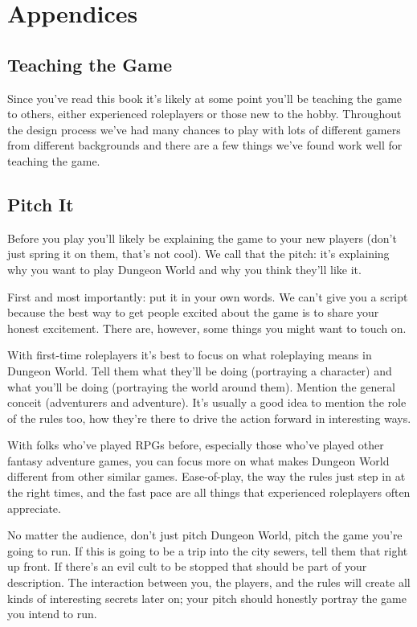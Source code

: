 \chapter{Appendices}
\section{Teaching the Game}


Since you've read this book it's likely at some point you'll be teaching the game to others, either experienced roleplayers or those new to the hobby. Throughout the design process we've had many chances to play with lots of different gamers from different backgrounds and there are a few things we've found work well for teaching the game.
\section*{Pitch It}


Before you play you'll likely be explaining the game to your new players (don't just spring it on them, that's not cool). We call that the pitch: it's explaining why you want to play Dungeon World and why you think they'll like it.


First and most importantly: put it in your own words. We can't give you a script because the best way to get people excited about the game is to share your honest excitement. There are, however, some things you might want to touch on.


With first-time roleplayers it's best to focus on what roleplaying means in Dungeon World. Tell them what they'll be doing (portraying a character) and what you'll be doing (portraying the world around them). Mention the general conceit (adventurers and adventure). It's usually a good idea to mention the role of the rules too, how they're there to drive the action forward in interesting ways.


With folks who've played RPGs before, especially those who've played other fantasy adventure games, you can focus more on what makes Dungeon World different from other similar games. Ease-of-play, the way the rules just step in at the right times, and the fast pace are all things that experienced roleplayers often appreciate.


No matter the audience, don't just pitch Dungeon World, pitch the game you're going to run. If this is going to be a trip into the city sewers, tell them that right up front. If there's an evil cult to be stopped that should be part of your description. The interaction between you, the players, and the rules will create all kinds of interesting secrets later on; your pitch should honestly portray the game you intend to run.

